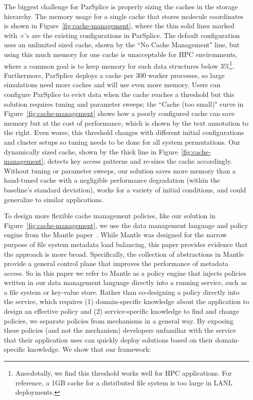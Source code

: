 The biggest challenge for ParSplice is properly sizing the caches in the
storage hierarchy.  The memory usage for a single cache that stores molecule
coordinates is shown in Figure~\ref{fig:cache-management}, where the thin solid
lines marked with \(\times\)'s are the existing configurations in ParSplice.
The default configuration uses an unlimited sized cache, shown by the ``No
Cache Management" line, but using this much memory for one cache is
unacceptable for HPC environments, where a common goal is to keep memory for
such data structures below 3\%\footnote{Anecdotally, we find this threshold
works well for HPC applications.  For reference, a 1GB cache for a distributed
file system is too large in LANL deployments.}. Furthermore, ParSplice deploys
a cache per 300 worker processes, so large simulations need more caches and
will use even more memory.  Users can configure ParSplice to evict data when
the cache reaches a threshold but this solution requires tuning and parameter
sweeps; the ``Cache (too small)" curve in Figure~\ref{fig:cache-management}
shows how a poorly configured cache can save memory but at the cost of
performance, which is shown by the text annotation to the right.  Even worse,
this threshold changes with different initial configurations and cluster setups
so tuning needs to be done for all system permutations.  Our dynamically sized
cache, shown by the thick line in Figure~\ref{fig:cache-management}, detects
key access patterns and re-sizes the cache accordingly.  Without tuning or
parameter sweeps, our solution saves more memory than a hand-tuned cache with a
negligible performance degradation (within the baseline's standard deviation),
works for a variety of initial conditions, and could generalize to similar
applications.

To design more flexible cache management policies, like our solution in
Figure~\ref{fig:cache-management}, we use the data management language and
policy engine from the Mantle paper~\cite{sevilla:sc15-mantle}.  While Mantle
was designed for the narrow purpose of file system metadata load balancing,
this paper provides evidence that the approach is more broad.  Specifically,
the collection of abstractions in Mantle provide a general control plane that
improves the performance of metadata access. So in this paper we refer to
Mantle as a policy engine that injects policies written in our data management
language directly into a running service, such as a file system or key-value
store.  Rather than co-designing a policy directly into the service, which
requires (1) domain-specific knowledge about the application to design an
effective policy and (2) service-specific knowledge to find and change
policies, we separate policies from mechanisms in a general way. By exposing
these policies (and not the mechanism) developers unfamiliar with the service
that their application uses can quickly deploy solutions based on their
domain-specific knowledge.  We show that our framework:

